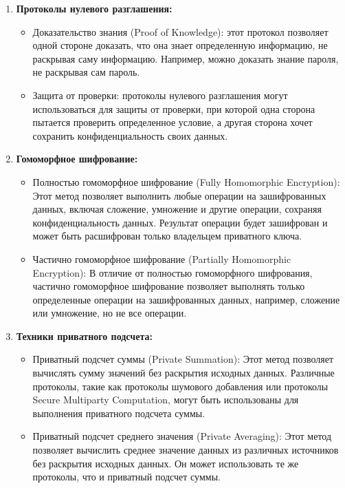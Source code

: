 \begin{enumerate}
    \item \textbf{Протоколы нулевого разглашения:} \begin{itemize}
        \item Доказательство знания (Proof of Knowledge): этот протокол позволяет одной стороне доказать, что она знает определенную информацию, не раскрывая саму информацию. Например, можно доказать знание пароля, не раскрывая сам пароль.
        \item Защита от проверки: протоколы нулевого разглашения могут использоваться для защиты от проверки, при которой одна сторона пытается проверить определенное условие, а другая сторона хочет сохранить конфиденциальность своих данных.
    \end{itemize}

    \item \textbf{Гомоморфное шифрование:} \begin{itemize}
        \item Полностью гомоморфное шифрование (Fully Homomorphic Encryption): Этот метод позволяет выполнить любые операции на зашифрованных данных, включая сложение, умножение и другие операции, сохраняя конфиденциальность данных. Результат операции будет зашифрован и может быть расшифрован только владельцем приватного ключа.
        \item Частично гомоморфное шифрование (Partially Homomorphic Encryption): В отличие от полностью гомоморфного шифрования, частично гомоморфное шифрование позволяет выполнять только определенные операции на зашифрованных данных, например, сложение или умножение, но не все операции.
    \end{itemize}

    \item \textbf{Техники приватного подсчета:} \begin{itemize}
        \item Приватный подсчет суммы (Private Summation): Этот метод позволяет вычислять сумму значений без раскрытия исходных данных. Различные протоколы, такие как протоколы шумового добавления или протоколы Secure Multiparty Computation, могут быть использованы для выполнения приватного подсчета суммы.
        \item Приватный подсчет среднего значения (Private Averaging): Этот метод позволяет вычислить среднее значение данных из различных источников без раскрытия исходных данных. Он может использовать те же протоколы, что и приватный подсчет суммы.
    \end{itemize}
\end{enumerate}

